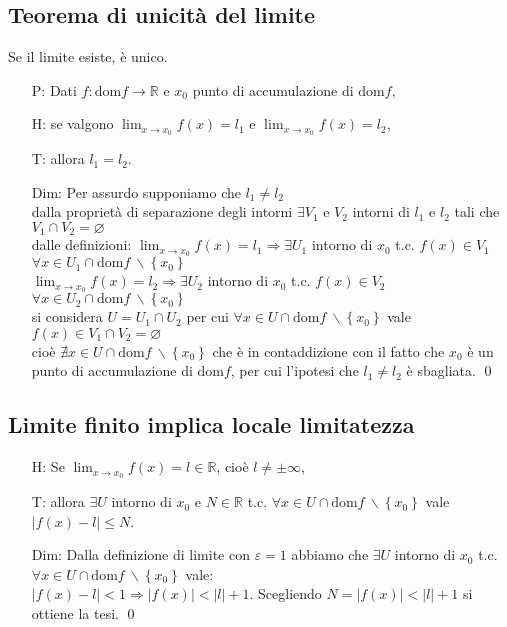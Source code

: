 \documentclass[a4paper]{article}
\newcommand\dom{\text{dom}}
\begin{document}
\subsection{Teorema di unicità del limite}
Se il limite esiste, è unico.
\begin{itemize}
	\item[P: ] Dati \(f: \dom f \to \mathbb{R}\) e \(x_0\) punto di accumulazione di \(\dom f\),
	\item[H: ] se valgono \(\displaystyle \lim_{x \to x_0} f(x) = l_1\) e \(\displaystyle \lim_{x \to x_0} f(x) = l_2\),
	\item[T: ] allora \(l_1 = l_2\).
	\item[Dim: ] Per assurdo supponiamo che \(l_1 \neq l_2\) \\
	dalla proprietà di separazione degli intorni \(\exists V_1\) e \(V_2\) intorni di \(l_1\) e \(l_2\) tali che \(V_1 \cap V_2 = \varnothing\) \\
	dalle definizioni: \(\lim_{x \to x_0} f(x) = l_1 \Rightarrow \exists U_1\) intorno di \(x_0\) t.c. \(f(x) \in V_1\) \(\forall x \in U_1 \cap \dom f \  \backslash \left\{ x_0 \right\}\) \\
	\(\lim_{x \to x_0} f(x) = l_2 \Rightarrow \exists U_2\) intorno di \(x_0\) t.c. \(f(x) \in V_2\) \(\forall x \in U_2 \cap \dom f \  \backslash \left\{ x_0 \right\}\) \\
	si considera \(U = U_1 \cap U_2\) per cui \(\forall x \in U \cap \dom f \  \backslash \left\{ x_0 \right\}\) vale \(f(x) \in V_1 \cap V_2 = \varnothing\) \\
	cioè \(\nexists x \in U \cap \dom f \  \backslash \left\{ x_0 \right\}\) che è in contaddizione con il fatto che \(x_0\) è un punto di accumulazione di \(\dom f\),
	per cui l'ipotesi che \(l_1 \neq l_2\) è sbagliata. \qed	
\end{itemize}


\subsection{Limite finito implica locale limitatezza}
\begin{itemize}
	\item[H: ] Se \(\displaystyle \lim_{x \to x_0} f(x) = l \in \mathbb{R}\), cioè \(l \neq \pm \infty\),
	\item[T: ] allora \(\exists U\) intorno di \(x_0\) e \(N \in \mathbb{R}\) t.c. \(\forall x \in U \cap \dom f \  \backslash \left\{ x_0 \right\}\) vale \(\left| f(x) - l \right| \leq N\).
	\item[Dim: ] Dalla definizione di limite con \(\varepsilon = 1\) abbiamo che \(\exists U\) intorno di \(x_0\) t.c. \(\forall x \in U \cap \dom f \  \backslash \left\{ x_0 \right\}\) vale: \\
	\(\left| f(x) - l \right| < 1 \Rightarrow \left| f(x) \right| < \left| l \right| + 1\).	Scegliendo \(N = \left| f(x) \right| < \left| l \right| + 1\) si ottiene la tesi. \qed 
\end{itemize}
\end{document}
